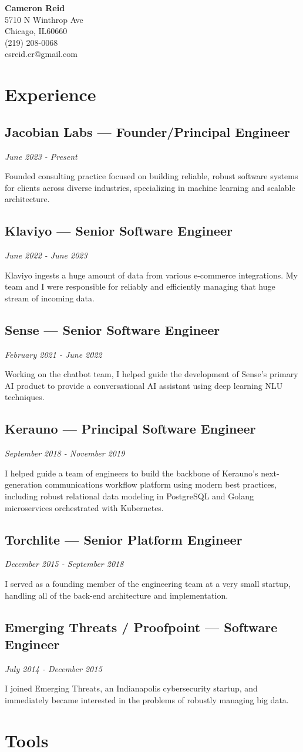 \documentclass[11pt,letterpaper]{article}
\makeatletter
\newcommand{\street}{5710 N Winthrop Ave}
\newcommand{\city}{Chicago}
\newcommand{\state}{IL}
\newcommand{\zip}{60660}
\newcommand{\phone}{(219) 208-0068}
\newcommand{\email}{csreid.cr@gmail.com}
\newcommand{\makeaddress}{%
	\street \\
	\city, \state \zip \\
	\phone \\
	\email
}
\newcommand{\job}[4]{%
	\subsection{#1 --- #2}
	\textit{#3}

	#4

	\vspace{0.1in}
}
\makeatother
\begin{document}
\begin{flushright}
{\huge\bfseries{Cameron Reid}}\\
\makeaddress
\end{flushright}

\setlength\columnsep{30pt}
\begin{paracol}{2}

\section{Experience}

	\job{Jacobian Labs}{Founder/Principal Engineer}{June 2023 - Present}{Founded consulting practice focused on building reliable, robust software systems for clients across diverse industries, specializing in machine learning and scalable architecture.}

	\job{Klaviyo}{Senior Software Engineer}{June 2022 - June 2023}{Klaviyo ingests a huge amount of data from various e-commerce integrations. My team and I were responsible for reliably and efficiently managing that huge stream of incoming data.}

	\job{Sense}{Senior Software Engineer}{February 2021 - June 2022}{Working on the chatbot team, I helped guide the development of Sense's primary AI product to provide a conversational AI assistant using deep learning NLU techniques.}

	\job{Kerauno}{Principal Software Engineer}{September 2018 - November 2019}{I helped guide a team of engineers to build the backbone of Kerauno's next-generation communications workflow platform using modern best practices, including robust relational data modeling in PostgreSQL and Golang microservices orchestrated with Kubernetes.}

	\job{Torchlite}{Senior Platform Engineer}{December 2015 - September 2018}{I served as a founding member of the engineering team at a very small startup, handling all of the back-end architecture and implementation.}

	\job{Emerging Threats / Proofpoint}{Software Engineer}{July 2014 - December 2015}{I joined Emerging Threats, an Indianapolis cybersecurity startup, and immediately became interested in the problems of robustly managing big data.}

\switchcolumn

\section{Tools}


\end{paracol}
\end{document}
